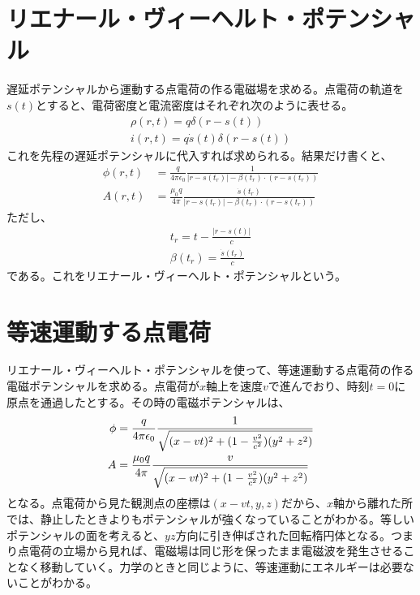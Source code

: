     \section{リエナール・ヴィーヘルト・ポテンシャル}
        遅延ポテンシャルから運動する点電荷の作る電磁場を求める。点電荷の軌道を$s(t)$とすると、電荷密度と電流密度はそれぞれ次のように表せる。
        \begin{align*}
            \rho(r,t) = q\delta(r-s(t))\\
            i(r,t) = q\dot{s}(t)\delta(r-s(t))
        \end{align*}
        これを先程の遅延ポテンシャルに代入すれば求められる。結果だけ書くと、
        \begin{align*}
            \phi(r,t) &= \frac{q}{4\pi\epsilon_0}
            \frac{1}{|r-s(t_r)|-\beta(t_r)\cdot (r-s(t_r))}\\
            A(r,t) &= \frac{\mu_0q}{4\pi}
            \frac{\dot{s}(t_r)}{|r-s(t_r)|-\beta(t_r)\cdot (r-s(t_r))}
        \end{align*}
        ただし、
        \begin{align*}
            t_r = t-\frac{|r-s(t)|}{c}\\
            \beta(t_r) = \frac{\dot{s}(t_r)}{c}
        \end{align*}
        である。これをリエナール・ヴィーヘルト・ポテンシャルという。
    \section{等速運動する点電荷}
        リエナール・ヴィーヘルト・ポテンシャルを使って、等速運動する点電荷の作る電磁ポテンシャルを求める。点電荷が$x$軸上を速度$v$で進んでおり、時刻$t=0$に原点を通過したとする。その時の電磁ポテンシャルは、
        \begin{align*}
            \phi &= \frac{q}{4\pi\epsilon_0}
            \frac{1}{\sqrt{(x-vt)^2+(1-\frac{v^2}{c^2})(y^2+z^2)}}\\
            A &= \frac{\mu_0q}{4\pi}
            \frac{v}{\sqrt{(x-vt)^2+(1-\frac{v^2}{c^2})(y^2+z^2)}}
        \end{align*}
        となる。点電荷から見た観測点の座標は$(x-vt,y,z)$だから、$x$軸から離れた所では、静止したときよりもポテンシャルが強くなっていることがわかる。等しいポテンシャルの面を考えると、$yz$方向に引き伸ばされた回転楕円体となる。つまり点電荷の立場から見れば、電磁場は同じ形を保ったまま電磁波を発生させることなく移動していく。力学のときと同じように、等速運動にエネルギーは必要ないことがわかる。
